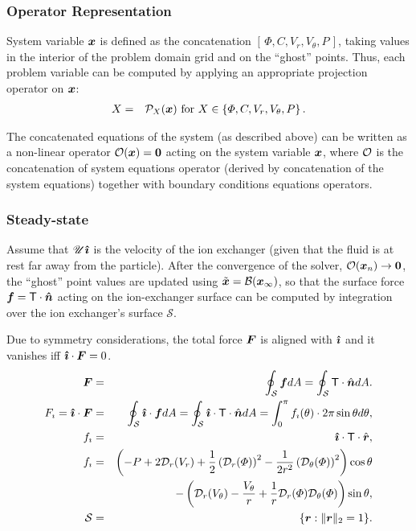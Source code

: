 \subsubsection{Operator Representation}
System variable $\boldsymbol{x}$ is defined as the concatenation $[\,\varPhi, C, V_r, V_\theta, P\,]$,
taking values in the interior of the problem domain grid and on the ``ghost'' points.
Thus, each problem variable can be computed by applying an appropriate projection operator on $\boldsymbol{x}$:
\begin{eqnarray}
X &=& \mathcal{P}_X(\boldsymbol{x}) \mbox{ for } X \in \left\{\varPhi, C, V_r, V_\theta, P\right\}.
\end{eqnarray}

The concatenated equations of the system (as described above) can be written 
as a non-linear operator $\mathcal{O}(\boldsymbol{x}) = \boldsymbol{0}$ acting on the system variable 
$\boldsymbol{x}$, where $\mathcal{O}$ is the concatenation of system equations operator 
(derived by concatenation of the system equations) together with
boundary conditions equations operators.

\subsubsection{Steady-state}
Assume that $\mathscr{U} \boldsymbol{\hat{\imath}}$ is the velocity of the ion exchanger 
(given that the fluid is at rest far away from the particle).
After the convergence of the solver, $\mathcal{O}(\boldsymbol{x}_n) \rightarrow \boldsymbol{0}$, 
the ``ghost'' point values are updated using $\tilde{\boldsymbol{x}} = \mathcal{B}(\boldsymbol{x}_\infty)$,
so  that the surface force $\boldsymbol{f} = \mathsf{T} \cdot \boldsymbol{\hat{n}}$ acting 
on the ion-exchanger surface
can be computed by integration over the ion exchanger's surface $\mathcal S$.

Due to symmetry considerations, the total force $\boldsymbol{F}$ is 
aligned with $\boldsymbol{\hat{\imath}}$ and it vanishes iff $\boldsymbol{\hat{\imath}} \cdot \boldsymbol{F} = 0$.
\begin{eqnarray}
\boldsymbol{F} &=& \oint_\mathcal{S} \boldsymbol{f}  dA = 
\oint_\mathcal{S} \mathsf{T} \cdot \hat{\boldsymbol{n}}  dA. \\
F_\imath = \boldsymbol{\hat{\imath}} \cdot \boldsymbol{F} &=& \oint_\mathcal{S} \boldsymbol{\hat{\imath}} \cdot \boldsymbol{f}  dA = 
\oint_\mathcal{S} \boldsymbol{\hat{\imath}} \cdot \mathsf{T} \cdot \hat{\boldsymbol{n}}  dA = 
\int_0^\pi f_\imath(\theta) \cdot 2\pi \sin\theta d\theta ,
\\  
f_\imath &=& \boldsymbol{\hat{\imath}} \cdot \mathsf{T} \cdot \hat{\boldsymbol{r}},
\\  
f_\imath &=& \left(-P + 2\mathcal{D}_r(V_r) + 
\frac{1}{2}\left(\mathcal{D}_r(\varPhi)\right)^2 - \frac{1}{2r^2}\left(\mathcal{D}_\theta(\varPhi)\right)^2\right)\cos\theta 
\\  
&& -\left(\mathcal{D}_r(V_\theta) - \frac{V_\theta}{r}
+ \frac{1}{r}\mathcal{D}_r(\varPhi) \mathcal{D}_{\theta}(\varPhi)\right)\sin\theta, \\
 \mathcal{S} &=& \{\boldsymbol{r} : \|\boldsymbol{r}\|_2 = 1\}.
\end{eqnarray}

